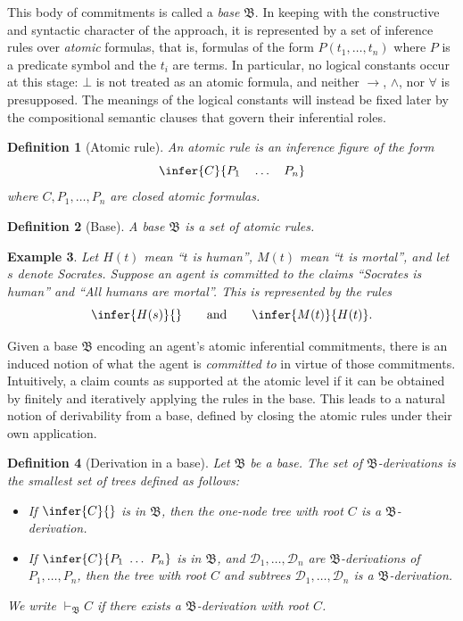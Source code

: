 \documentclass[reqno]{asl}
\newtheorem{definition}{Definition}
\newtheorem{example}[definition]{Example}
\newcommand{\proves}{\vdash}
\newcommand{\base}[1]{\mathfrak{#1}}
\begin{document}
This body of commitments is called a \emph{base} $\base{B}$. In keeping with the constructive and syntactic character of the approach, it is represented by a set of inference rules over \emph{atomic} formulas, that is, formulas of the form $P(t_1,\ldots,t_n)$ where $P$ is a predicate symbol and the $t_i$ are terms. In particular, no logical constants occur at this stage: $\bot$ is not treated as an atomic formula, and neither $\to$, $\land$, nor $\forall$ is presupposed. The meanings of the logical constants will instead be fixed later by the compositional semantic clauses that govern their inferential roles.


\begin{definition}[Atomic rule]
An \emph{atomic rule} is an inference figure of the form
\[
\infer{C}{P_1 \quad \ldots \quad P_n}
\]
where $C, P_1, \ldots, P_n$ are closed atomic formulas.
\end{definition}

\begin{definition}[Base]
A \emph{base} $\base{B}$ is a set of atomic rules.
\end{definition}

\begin{example}\label{ex:socrates}
Let $H(t)$ mean ``$t$ is human'', $M(t)$ mean ``$t$ is mortal'', and let $s$ denote Socrates. Suppose an agent is committed to the claims ``Socrates is human'' and ``All humans are mortal''. This is represented by the rules
\[
\infer{H(s)}{} \qquad\text{and}\qquad \infer{M(t)}{H(t)}.
\]
\end{example}

Given a base $\base{B}$ encoding an agent's atomic inferential commitments, there is an induced notion of what the agent is \emph{committed to} in virtue of those commitments. Intuitively, a claim counts as supported at the atomic level if it can be obtained by finitely and iteratively applying the rules in the base. This leads to a natural notion of derivability from a base, defined by closing the atomic rules under their own application.


\begin{definition}[Derivation in a base]\label{def:der-base}
Let $\base{B}$ be a base. The set of $\base{B}$-derivations is the smallest set of trees defined as follows:
\begin{itemize}
  \item[\textsc{Ref}] If $\infer{C}{}$ is in $\base{B}$, then the one-node tree with root $C$ is a $\base{B}$-derivation.
  \item[\textsc{App}] If $\infer{C}{P_1 \ \ldots \ P_n}$ is in $\base{B}$, and $\mathcal{D}_1, \ldots, \mathcal{D}_n$ are $\base{B}$-derivations of $P_1, \ldots, P_n$, then the tree with root $C$ and subtrees $\mathcal{D}_1, \ldots, \mathcal{D}_n$ is a $\base{B}$-derivation.
\end{itemize}
We write $\proves_{\base{B}} C$ if there exists a $\base{B}$-derivation with root $C$.
\end{definition}
\end{document}
